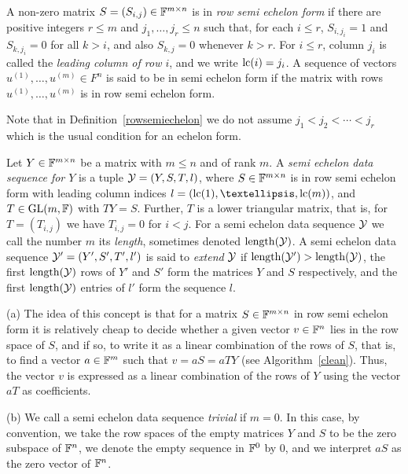 \begin{Def}
    \label{rowsemiechelon}
{\rm
    A non-zero matrix $S = (S_{i,j}) \in \mathbb{F}^{m \times n}$ is in 
    \emph{row semi echelon form} if there are positive 
    integers $r \le m$ and $j_1,\ldots,j_r \le n$ such that,
    for each $i \le r$, $S_{i,j_i} = 1$ and $S_{k,j_i} = 0$ for all $k > i$, 
    and also $S_{k,j} = 0$ whenever $k > r$. For $i \le r$, column 
    $j_i$ is called the \emph{leading column of row $i$}, and we write
    $\mathrm{lc}(i) = j_i$. A sequence of vectors $u^{(1)},\ldots,u^{(m)} \in F^n$ is 
    said to be in semi echelon form if the matrix with rows 
    $u^{(1)},\ldots,u^{(m)}$ is in row semi echelon form.

}
\end{Def}

\noindent
Note that in Definition~\ref{rowsemiechelon} we do not assume 
$j_1 < j_2 < \cdots < j_r$ which is the usual condition for an echelon
form.

\begin{Def}
    \label{semiecheseq}
{\rm    Let $Y \in \mathbb{F}^{m \times n}$ be a matrix with $m \le n$ and of rank $m$. A 
    \emph{semi echelon data sequence for $Y$} is a tuple $\mathcal{Y}=
(Y,S,T,l)$, where
    $S \in \mathbb{F}^{m \times n}$ is in row semi echelon form with
    leading column indices $l = (\lc(1), \ldots, \lc(m))$, and
    $T \in \GL(m,\F)$ with $TY=S$. Further, $T$ is a lower triangular
    matrix, that is, for $T = (T_{i,j})$ we have
    $T_{i,j} = 0$ for $i < j$. For a semi echelon data sequence $\mathcal{Y}$
    we call the number $m$ its \emph{length}, sometimes denoted
    $\mathrm{length}(\mathcal{Y})$.
A semi echelon data sequence $\mathcal{Y}'=(Y',S',T',l')$ is said to 
\emph{extend} $\mathcal{Y}$
if $\mathrm{length}(\mathcal{Y}')>\mathrm{length}(\mathcal{Y})$, the first $\mathrm{length}(\mathcal{Y})$ rows of $Y'$ and $S'$ form
the matrices $Y$ and $S$ respectively, and the first $\mathrm{length}(\mathcal{Y})$ entries of $l'$
form the sequence $l$. 
}
\end{Def}

\begin{Rem}\label{rem:seds}
(a) The idea of this concept is that for a matrix 
$S \in \mathbb{F}^{m\times n}$ in row semi echelon form it is relatively
cheap to decide whether a given vector $v \in \mathbb{F}^n$ lies in the row
space of $S$, and if so, to write it as a linear combination of the
rows of $S$, that is, to find a vector $a \in \mathbb{F}^m$ such that
$v = aS = aTY$ (see Algorithm~\ref{clean}). Thus, the vector
$v$ is expressed as a linear combination of the rows of $Y$
using the vector $aT$ as coefficients.

(b) We call a semi echelon data sequence \emph{trivial} if $m=0$.
In this case, by convention, we take the row spaces of
the empty matrices $Y$ and $S$ to be the zero subspace of $\mathbb{F}^n$, we
denote the empty sequence in $\mathbb{F}^0$ by $0$, and we interpret $aS$ as
the zero vector of $\mathbb{F}^n$.
\end{Rem}


